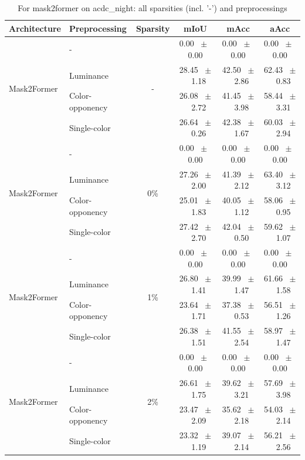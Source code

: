 \begin{table}[h]
  \centering
  \caption{For mask2former on acdc_night: all sparsities (incl. '-') and preprocessings}
  \begin{tabular}{@{}l l c c c c@{}}
    \toprule
    Architecture & Preprocessing & Sparsity & mIoU & mAcc & aAcc \\
    \midrule
    \multirow{4}{*}{Mask2Former} & - & \multirow{4}{*}{-} & 0.00 ~$\pm$~ 0.00 & 0.00 ~$\pm$~ 0.00 & 0.00 ~$\pm$~ 0.00 \\
    & Luminance &  & 28.45 ~$\pm$~ 1.18 & 42.50 ~$\pm$~ 2.86 & 62.43 ~$\pm$~ 0.83 \\
    & Color-opponency &  & 26.08 ~$\pm$~ 2.72 & 41.45 ~$\pm$~ 3.98 & 58.44 ~$\pm$~ 3.31 \\
    & Single-color &  & 26.64 ~$\pm$~ 0.26 & 42.38 ~$\pm$~ 1.67 & 60.03 ~$\pm$~ 2.94 \\
    \midrule
    \multirow{4}{*}{Mask2Former} & - & \multirow{4}{*}{0\%} & 0.00 ~$\pm$~ 0.00 & 0.00 ~$\pm$~ 0.00 & 0.00 ~$\pm$~ 0.00 \\
    & Luminance &  & 27.26 ~$\pm$~ 2.00 & 41.39 ~$\pm$~ 2.12 & 63.40 ~$\pm$~ 3.12 \\
    & Color-opponency &  & 25.01 ~$\pm$~ 1.83 & 40.05 ~$\pm$~ 1.12 & 58.06 ~$\pm$~ 0.95 \\
    & Single-color &  & 27.42 ~$\pm$~ 2.70 & 42.04 ~$\pm$~ 0.50 & 59.62 ~$\pm$~ 1.07 \\
    \midrule
    \multirow{4}{*}{Mask2Former} & - & \multirow{4}{*}{1\%} & 0.00 ~$\pm$~ 0.00 & 0.00 ~$\pm$~ 0.00 & 0.00 ~$\pm$~ 0.00 \\
    & Luminance &  & 26.80 ~$\pm$~ 1.41 & 39.99 ~$\pm$~ 1.47 & 61.66 ~$\pm$~ 1.58 \\
    & Color-opponency &  & 23.64 ~$\pm$~ 1.71 & 37.38 ~$\pm$~ 0.53 & 56.51 ~$\pm$~ 1.26 \\
    & Single-color &  & 26.38 ~$\pm$~ 1.51 & 41.55 ~$\pm$~ 2.54 & 58.97 ~$\pm$~ 1.47 \\
    \midrule
    \multirow{4}{*}{Mask2Former} & - & \multirow{4}{*}{2\%} & 0.00 ~$\pm$~ 0.00 & 0.00 ~$\pm$~ 0.00 & 0.00 ~$\pm$~ 0.00 \\
    & Luminance &  & 26.61 ~$\pm$~ 1.75 & 39.62 ~$\pm$~ 3.21 & 57.69 ~$\pm$~ 3.98 \\
    & Color-opponency &  & 23.47 ~$\pm$~ 2.09 & 35.62 ~$\pm$~ 2.18 & 54.03 ~$\pm$~ 2.14 \\
    & Single-color &  & 23.32 ~$\pm$~ 1.19 & 39.07 ~$\pm$~ 2.14 & 56.21 ~$\pm$~ 2.56 \\
    \midrule

\end{tabular}
\end{table}
